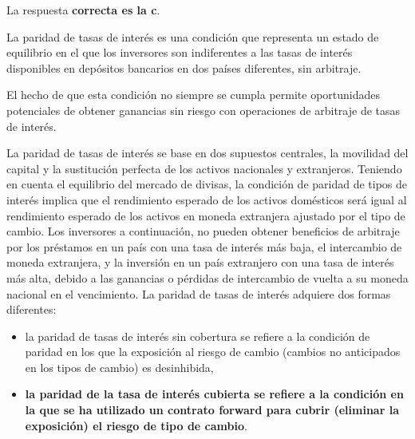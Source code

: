 \documentclass[
  letterpaper,
  DIV=11,
  numbers=noendperiod]{scrreprt}
\begin{document}
\begin{tcolorbox}[enhanced jigsaw, left=2mm, opacityback=0, colback=white, breakable, arc=.35mm, bottomrule=.15mm, rightrule=.15mm, toprule=.15mm, leftrule=.75mm, colframe=quarto-callout-tip-color-frame]
\begin{minipage}[t]{5.5mm}
\textcolor{quarto-callout-tip-color}{\faLightbulb}
\end{minipage}%
\begin{minipage}[t]{\textwidth - 5.5mm}

La respuesta \textbf{correcta es la c}.

La paridad de tasas de interés es una condición que representa un estado
de equilibrio en el que los inversores son indiferentes a las tasas de
interés disponibles en depósitos bancarios en dos países diferentes, sin
arbitraje.

El hecho de que esta condición no siempre se cumpla permite
oportunidades potenciales de obtener ganancias sin riesgo con
operaciones de arbitraje de tasas de interés.

La paridad de tasas de interés se base en dos supuestos centrales, la
movilidad del capital y la sustitución perfecta de los activos
nacionales y extranjeros. Teniendo en cuenta el equilibrio del mercado
de divisas, la condición de paridad de tipos de interés implica que el
rendimiento esperado de los activos domésticos será igual al rendimiento
esperado de los activos en moneda extranjera ajustado por el tipo de
cambio. Los inversores a continuación, no pueden obtener beneficios de
arbitraje por los préstamos en un país con una tasa de interés más baja,
el intercambio de moneda extranjera, y la inversión en un país
extranjero con una tasa de interés más alta, debido a las ganancias o
pérdidas de intercambio de vuelta a su moneda nacional en el
vencimiento. La paridad de tasas de interés adquiere dos formas
diferentes:

\begin{itemize}
\item
  la paridad de tasas de interés sin cobertura se refiere a la condición
  de paridad en los que la exposición al riesgo de cambio (cambios no
  anticipados en los tipos de cambio) es desinhibida,
\item
  \textbf{la paridad de la tasa de interés cubierta se refiere a la
  condición en la que se ha utilizado un contrato forward para cubrir
  (eliminar la exposición) el riesgo de tipo de cambio}.
\end{itemize}

\end{minipage}%
\end{tcolorbox}
\end{document}
